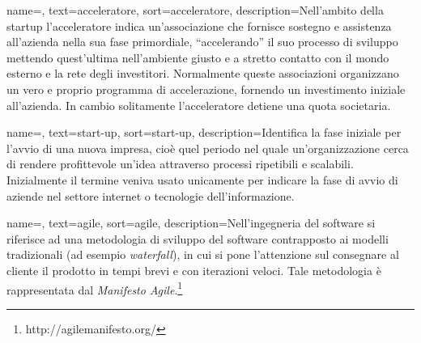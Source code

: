 
\renewcommand{\acronymname}{Acronimi e abbreviazioni}






   
\renewcommand{\glossaryname}{Glossario}

{
    name=,
    text=acceleratore,
    sort=acceleratore,
    description={Nell'ambito della startup l'acceleratore indica un'associazione che fornisce sostegno e assistenza all'azienda nella sua fase primordiale, ``accelerando'' il suo processo di sviluppo mettendo quest'ultima nell'ambiente giusto e a stretto contatto con il mondo esterno e la rete degli investitori. Normalmente queste associazioni organizzano un vero e proprio programma di accelerazione, fornendo un investimento iniziale all'azienda. In cambio solitamente l'acceleratore detiene una quota societaria.}
}

{
    name=,
    text=start-up,
    sort=start-up,
    description={Identifica la fase iniziale per l'avvio di una nuova impresa, cioè quel periodo nel quale un'organizzazione cerca di rendere profittevole un'idea attraverso processi ripetibili e scalabili. Inizialmente il termine veniva usato unicamente per indicare la fase di avvio di aziende nel settore internet o tecnologie dell'informazione.}
}

{
    name=,
    text=agile,
    sort=agile,
    description={Nell'ingegneria del software si riferisce ad una metodologia di sviluppo del software contrapposto ai modelli tradizionali (ad esempio \textit{waterfall}), in cui si pone l'attenzione sul consegnare al cliente il prodotto in tempi brevi e con iterazioni veloci. Tale metodologia è rappresentata dal \textit{Manifesto Agile}.\footnote{http://agilemanifesto.org/}}
}

